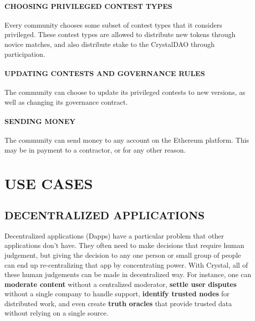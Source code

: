 \paragraph{CHOOSING PRIVILEGED CONTEST
TYPES}\label{choosing-privileged-contest-types}

Every community chooses some subset of contest types that it considers
privileged. These contest types are allowed to distribute new tokens
through novice matches, and also distribute stake to the CrystalDAO
through participation.

\paragraph{UPDATING CONTESTS AND GOVERNANCE
RULES}\label{updating-contests-and-governance-rules}

The community can choose to update its privileged contests to new
versions, as well as changing its governance contract.

\paragraph{SENDING MONEY}\label{sending-money-1}

The community can send money to any account on the Ethereum platform.
This may be in payment to a contractor, or for any other reason.

\section{\texorpdfstring{\protect\hypertarget{_b8uc7ra9s827}{}{\protect\hypertarget{_Toc462050431}{}{}}USE
CASES}{USE CASES}}\label{use-cases}

\subsection{\texorpdfstring{\protect\hypertarget{_rd5rdlioo2za}{}{\protect\hypertarget{_Toc462050432}{}{}}DECENTRALIZED
APPLICATIONS}{DECENTRALIZED APPLICATIONS}}\label{decentralized-applications}

Decentralized applications (Dapps) have a particular problem that other
applications don't have. They often need to make decisions that require
human judgement, but giving the decision to any one person or small
group of people can end up re-centralizing that app by concentrating
power. With Crystal, all of these human judgements can be made in
decentralized way. For instance, one can \textbf{moderate content}
without a centralized moderator, \textbf{settle user disputes} without a
single company to handle support, \textbf{identify trusted nodes} for
distributed work, and even create \textbf{truth oracles} that provide
trusted data without relying on a single source.

